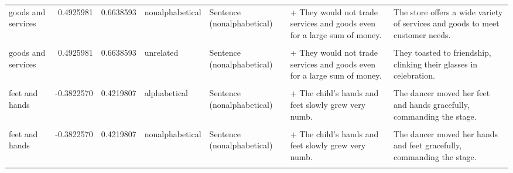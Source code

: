 \documentclass[
  12pt,
]{scrartcl}
\begin{document}
\begin{landscape}
\begin{longtable}{lrrllll}
goods and services & 0.4925981 & 0.6638593 & nonalphabetical & Sentence (nonalphabetical) & + They would not trade services and goods even for a large sum of money. & The store offers a wide variety of services and goods to meet customer needs.\\
\cellcolor{gray!6}{goods and services} & \cellcolor{gray!6}{0.4925981} & \cellcolor{gray!6}{0.6638593} & \cellcolor{gray!6}{unrelated} & \cellcolor{gray!6}{Sentence (alphabetical)} & \cellcolor{gray!6}{+ They would not trade goods and services even for a large sum of money.} & \cellcolor{gray!6}{They toasted to friendship, clinking their glasses in celebration.}\\
goods and services & 0.4925981 & 0.6638593 & unrelated & Sentence (nonalphabetical) & + They would not trade services and goods even for a large sum of money. & They toasted to friendship, clinking their glasses in celebration.\\
\cellcolor{gray!6}{feet and hands} & \cellcolor{gray!6}{-0.3822570} & \cellcolor{gray!6}{0.4219807} & \cellcolor{gray!6}{alphabetical} & \cellcolor{gray!6}{Sentence (alphabetical)} & \cellcolor{gray!6}{+ The child's feet and hands slowly grew very numb.} & \cellcolor{gray!6}{The dancer moved her feet and hands gracefully, commanding the stage.}\\
\addlinespace
feet and hands & -0.3822570 & 0.4219807 & alphabetical & Sentence (nonalphabetical) & + The child's hands and feet slowly grew very numb. & The dancer moved her feet and hands gracefully, commanding the stage.\\
\cellcolor{gray!6}{feet and hands} & \cellcolor{gray!6}{-0.3822570} & \cellcolor{gray!6}{0.4219807} & \cellcolor{gray!6}{nonalphabetical} & \cellcolor{gray!6}{Sentence (alphabetical)} & \cellcolor{gray!6}{+ The child's feet and hands slowly grew very numb.} & \cellcolor{gray!6}{The dancer moved her hands and feet gracefully, commanding the stage.}\\
feet and hands & -0.3822570 & 0.4219807 & nonalphabetical & Sentence (nonalphabetical) & + The child's hands and feet slowly grew very numb. & The dancer moved her hands and feet gracefully, commanding the stage.\\
\cellcolor{gray!6}{feet and hands} & \cellcolor{gray!6}{-0.3822570} & \cellcolor{gray!6}{0.4219807} & \cellcolor{gray!6}{unrelated} & \cellcolor{gray!6}{Sentence (alphabetical)} & \cellcolor{gray!6}{+ The child's feet and hands slowly grew very numb.} & \cellcolor{gray!6}{The crisp autumn air was filled with the scent of pine and fallen leaves.}\\

\end{longtable}
\end{landscape}
\end{document}
